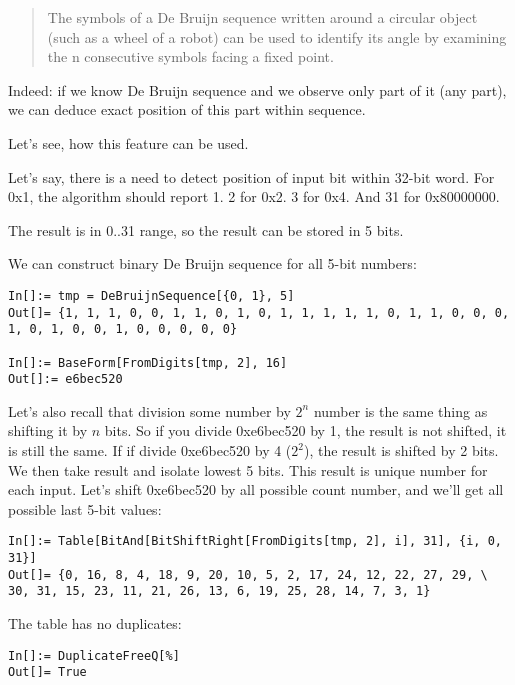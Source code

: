 \begin{framed}
\begin{quotation}
The symbols of a De Bruijn sequence written around a circular object (such as a wheel of a robot) can be used to identify its angle by examining the n consecutive symbols facing a fixed point.
\end{quotation}
\end{framed}

Indeed: if we know De Bruijn sequence and we observe only part of it (any part), we can deduce exact position of this part within sequence.

Let's see, how this feature can be used.

Let's say, there is a need to detect position of input bit within 32-bit word.
For 0x1, the algorithm should report 1.
2 for 0x2.
3 for 0x4.
And 31 for 0x80000000.

The result is in 0..31 range, so the result can be stored in 5 bits.

We can construct binary De Bruijn sequence for all 5-bit numbers:

\begin{lstlisting}
In[]:= tmp = DeBruijnSequence[{0, 1}, 5]
Out[]= {1, 1, 1, 0, 0, 1, 1, 0, 1, 0, 1, 1, 1, 1, 1, 0, 1, 1, 0, 0, 0, 1, 0, 1, 0, 0, 1, 0, 0, 0, 0, 0}

In[]:= BaseForm[FromDigits[tmp, 2], 16]
Out[]:= e6bec520
\end{lstlisting}

Let's also recall that division some number by $2^n$ number is the same thing as shifting it by $n$ bits.
So if you divide 0xe6bec520 by 1, the result is not shifted, it is still the same.
If if divide 0xe6bec520 by 4 ($2^2$), the result is shifted by 2 bits.
We then take result and isolate lowest 5 bits.
This result is unique number for each input.
Let's shift 0xe6bec520 by all possible count number, and we'll get all possible last 5-bit values:

\begin{lstlisting}
In[]:= Table[BitAnd[BitShiftRight[FromDigits[tmp, 2], i], 31], {i, 0, 31}]
Out[]= {0, 16, 8, 4, 18, 9, 20, 10, 5, 2, 17, 24, 12, 22, 27, 29, \
30, 31, 15, 23, 11, 21, 26, 13, 6, 19, 25, 28, 14, 7, 3, 1}
\end{lstlisting}

The table has no duplicates:

\begin{lstlisting}
In[]:= DuplicateFreeQ[%]
Out[]= True
\end{lstlisting}

